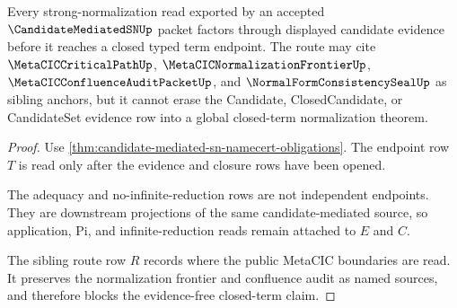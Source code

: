 \begin{theorem}
\label{thm:candidate-mediated-sn-frontier-handoff}
Every strong-normalization read exported by an accepted $\CandidateMediatedSNUp$ packet factors through displayed candidate evidence before it reaches a closed typed term endpoint. The route may cite $\MetaCICCriticalPathUp$, $\MetaCICNormalizationFrontierUp$, $\MetaCICConfluenceAuditPacketUp$, and $\NormalFormConsistencySealUp$ as sibling anchors, but it cannot erase the Candidate, ClosedCandidate, or CandidateSet evidence row into a global closed-term normalization theorem.
\end{theorem}
\begin{proof}
Use \autoref{thm:candidate-mediated-sn-namecert-obligations}. The endpoint row $T$ is read only after the evidence and closure rows have been opened.

The adequacy and no-infinite-reduction rows are not independent endpoints. They are downstream projections of the same candidate-mediated source, so application, Pi, and infinite-reduction reads remain attached to $E$ and $C$.

The sibling route row $R$ records where the public MetaCIC boundaries are read. It preserves the normalization frontier and confluence audit as named sources, and therefore blocks the evidence-free closed-term claim.
\end{proof}

